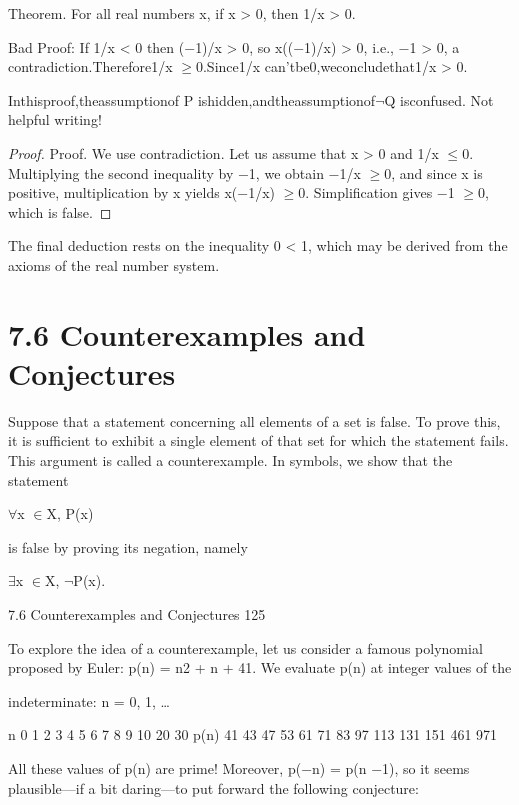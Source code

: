 \documentclass[11pt]{article}
\theoremstyle{plain}
\theoremstyle{definition}
\begin{document}
Theorem. For all real numbers x, if x > 0, then 1/x > 0.

Bad Proof: If 1/x < 0 then ($-$1)/x > 0, so x(($-$1)/x) > 0, i.e., $-$1 > 0, a contradiction.Therefore1/x $\geq$0.Since1/x can'tbe0,weconcludethat1/x > 0. 

Inthisproof,theassumptionof P ishidden,andtheassumptionof$\neg$Q isconfused. Not helpful writing!

\begin{proof}
Proof. We use contradiction. Let us assume that x > 0 and 1/x $\leq$0. Multiplying the second inequality by $-$1, we obtain $-$1/x $\geq$0, and since x is positive, multiplication by x yields x($-$1/x) $\geq$0. Simplification gives $-$1 $\geq$0, which is false. 
\end{proof}

The final deduction rests on the inequality 0 < 1, which may be derived from the axioms of the real number system.

\section{7.6 Counterexamples and Conjectures}

Suppose that a statement concerning all elements of a set is false. To prove this, it is sufficient to exhibit a single element of that set for which the statement fails. This argument is called a counterexample. In symbols, we show that the statement

$\forall$x $\in$X, P(x)

is false by proving its negation, namely

$\exists$x $\in$X, $\neg$P(x).

7.6 Counterexamples and Conjectures 125

To explore the idea of a counterexample, let us consider a famous polynomial proposed by Euler: p(n) = n2 + n + 41. We evaluate p(n) at integer values of the

indeterminate: n = 0, 1, \dots{}

n 0 1 2 3 4 5 6 7 8 9 10 \textperiodcentered{} \textperiodcentered{} \textperiodcentered{} 20 \textperiodcentered{} \textperiodcentered{} \textperiodcentered{} 30 p(n) 41 43 47 53 61 71 83 97 113 131 151 \textperiodcentered{} \textperiodcentered{} \textperiodcentered{} 461 \textperiodcentered{} \textperiodcentered{} \textperiodcentered{} 971

All these values of p(n) are prime! Moreover, p($-$n) = p(n $-$1), so it seems plausible---if a bit daring---to put forward the following conjecture:
\end{document}
